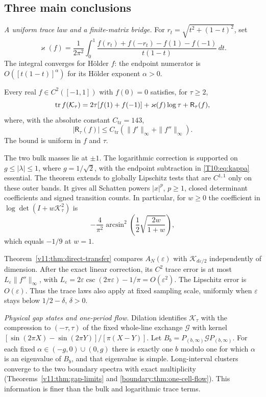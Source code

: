 \subsection*{Three main conclusions}
\emph{A uniform trace law and a finite-matrix bridge.}
For $r_t=\sqrt{t^2+(1-t)^2}$, set
\begin{equation}\label{T10:eq:kappa}
 \varkappa(f)=\frac1{2\pi^2}\int_0^1
 \frac{f(r_t)+f(-r_t)-f(1)-f(-1)}{t(1-t)}\,dt.
\end{equation}
The integral converges for H\"older $f$: the endpoint numerator is
$O([t(1-t)]^\alpha)$ for its H\"older exponent $\alpha>0$.
\begin{theorem}\label{T10:conj:law}
Every real $f\in C^2([-1,1])$ with $f(0)=0$ satisfies, for $\tau\ge2$,
\begin{equation}\label{T10:eq:law}
 \operatorname{tr} f(\mathcal K_\tau)
 =2\tau[f(1)+f(-1)]+\varkappa(f)\log\tau+\mathsf R_\tau(f),
\end{equation}
where, with the absolute constant $C_{\mathrm{tr}}=143$,
\begin{equation}\label{rev5:eq:uniform-remainder}
 |\mathsf R_\tau(f)|\le C_{\mathrm{tr}}
                    (\|f'\|_\infty+\|f''\|_\infty).
\end{equation}
The bound is uniform in $f$ and $\tau$.
\end{theorem}
The two bulk masses lie at $\pm1$. The logarithmic correction is
supported on $g\le|\lambda|\le1$, where $g=1/\sqrt2$, with the
endpoint subtraction in \eqref{T10:eq:kappa} essential. The theorem
extends to globally Lipschitz tests that are $C^{1,1}$ only on these
outer bands. It gives all Schatten powers $|x|^p$, $p\ge1$, closed
determinant coefficients and signed transition counts. In particular,
for $w\ge0$ the coefficient in $\log\det(I+w\mathcal K_\tau^2)$ is
\[
 -\frac4{\pi^2}\arcsin^2\!\left(\frac12\sqrt{\frac{2w}{1+w}}\right),
\]
which equals $-1/9$ at $w=1$.

Theorem~\ref{v11:thm:direct-transfer} compares $A_N(\varepsilon)$
with $\mathcal K_{d\varepsilon/2}$ independently of dimension.
After the exact linear correction, its $C^2$ trace error is at most
$L_\varepsilon\|f''\|_\infty$, with
$L_\varepsilon=2\varepsilon\csc(2\pi\varepsilon)-1/\pi
=O(\varepsilon^2)$. The Lipschitz error is $O(\varepsilon)$.
Thus the trace laws also apply at fixed sampling scale, uniformly
when $\varepsilon$ stays below $1/2-\delta$, $\delta>0$.

\emph{Physical gap states and one-period flow.}
Dilation identifies $\mathcal K_\tau$ with the compression to
$(-\tau,\tau)$ of the fixed whole-line exchange $\mathcal G$ with
kernel $[\sin(2\pi X)-\sin(2\pi Y)]/[\pi(X-Y)]$.
Let $B_b=P_{(b,\infty)}\mathcal G P_{(b,\infty)}$.
For each fixed $\alpha\in(-g,0)\cup(0,g)$ there is exactly one
$b$ modulo one for which $\alpha$ is an eigenvalue of $B_b$, and
that eigenvalue is simple. Long-interval clusters converge to the
two boundary spectra with exact multiplicity
(Theorems~\ref{v11:thm:gap-limits} and
\ref{boundary:thm:one-cell-flow}). This information is finer than the
bulk and logarithmic trace terms.

